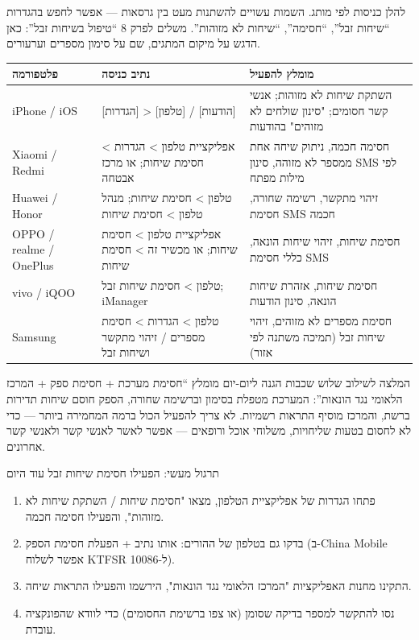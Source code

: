 
להלן כניסות לפי מותג. השמות עשויים להשתנות מעט בין גרסאות — אפשר לחפש בהגדרות “שיחות זבל”, “חסימה”, “שיחות לא מזוהות”. משלים לפרק 8 “טיפול בשיחות זבל”: כאן הדגש על מיקום המתגים, שם על סימון מספרים וערעורים.

\begin{center}
\begin{tabularx}{\linewidth}{|X|X|X|}
\hline
\textbf{פלטפורמה} & \textbf{נתיב כניסה} & \textbf{מומלץ להפעיל} \tabularnewline
\hline
iPhone / iOS & {}[הגדרות] > [טלפון] / [הודעות] & השתקת שיחות לא מזוהות; אנשי קשר חסומים; "סינון שולחים לא מזוהים" בהודעות \tabularnewline
Xiaomi / Redmi & אפליקציית טלפון > הגדרות > חסימת שיחות; או מרכז אבטחה & חסימה חכמה, ניתוק שיחה אחת ממספר לא מזוהה, סינון SMS לפי מילות מפתח \tabularnewline
Huawei / Honor & טלפון > חסימת שיחות; מנהל טלפון > חסימת שיחות & זיהוי מתקשר, רשימה שחורה, חסימת SMS חכמה \tabularnewline
OPPO / realme / OnePlus & אפליקציית טלפון > חסימת שיחות; או מכשיר זה > חסימת שיחות & חסימת שיחות, זיהוי שיחות הונאה, כללי חסימת SMS \tabularnewline
vivo / iQOO & טלפון > חסימת שיחות זבל; iManager & חסימת שיחות, אזהרת שיחות הונאה, סינון הודעות \tabularnewline
Samsung & טלפון > הגדרות > חסימת מספרים / זיהוי מתקשר ושיחות זבל & חסימת מספרים לא מזוהים, זיהוי שיחות זבל (תמיכה משתנה לפי אזור) \tabularnewline
\hline
\end{tabularx}
\end{center}

\begin{tcbinfo}{המלצה לשילוב שלוש שכבות הגנה}
ליום-יום מומלץ “חסימת מערכת + חסימת ספק + המרכז הלאומי נגד הונאות”: המערכת מטפלת בסימון וברשימה שחורה, הספק חוסם שיחות תדירות ברשת, והמרכז מוסיף התראות רשמיות. לא צריך להפעיל הכול ברמה המחמירה ביותר — כדי לא לחסום בטעות שליחויות, משלוחי אוכל ורופאים — אפשר לאשר לאנשי קשר ולאנשי קשר אחרונים.

\end{tcbinfo}

\begin{tcbpractice}{תרגול מעשי: הפעילו חסימת שיחות זבל עוד היום}
\begin{enumerate}
  \item פתחו הגדרות של אפליקציית הטלפון, מצאו "חסימת שיחות / השתקת שיחות לא מזוהות", והפעילו חסימה חכמה.
  \item בדקו גם בטלפון של ההורים: אותו נתיב + הפעלת חסימת הספק (ב-China Mobile אפשר לשלוח KTFSR ל-10086).
  \item התקינו מחנות האפליקציות "המרכז הלאומי נגד הונאות", הירשמו והפעילו התראות שיחה.
  \item נסו להתקשר למספר בדיקה שסומן (או צפו ברשימת החסומים) כדי לוודא שהפונקציה עובדת.
\end{enumerate}

\end{tcbpractice}

